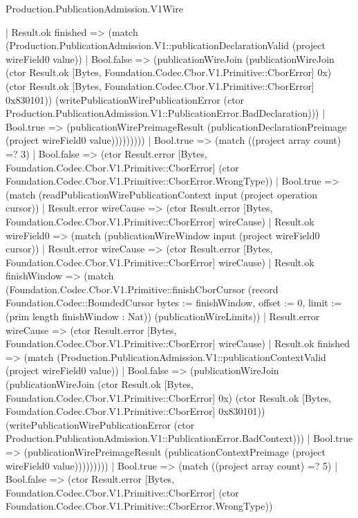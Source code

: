 \begin{lexlean}{Production.PublicationAdmission.V1Wire}
\begin{semanticmodule}
{                            | Result.ok finished => (match (Production.PublicationAdmission.V1::publicationDeclarationValid (project wireField0 value))
                              | Bool.false => (publicationWireJoin (publicationWireJoin (ctor Result.ok [Bytes, Foundation.Codec.Cbor.V1.Primitive::CborError] 0x) (ctor Result.ok [Bytes, Foundation.Codec.Cbor.V1.Primitive::CborError] 0x830101)) (writePublicationWirePublicationError (ctor Production.PublicationAdmission.V1::PublicationError.BadDeclaration)))
                              | Bool.true => (publicationWirePreimageResult (publicationDeclarationPreimage (project wireField0 value)))))))))
                  | Bool.true => (match ((project array count) =? 3)
                    | Bool.false => (ctor Result.error [Bytes, Foundation.Codec.Cbor.V1.Primitive::CborError] (ctor Foundation.Codec.Cbor.V1.Primitive::CborError.WrongType))
                    | Bool.true => (match (readPublicationWirePublicationContext input (project operation cursor))
                      | Result.error wireCause => (ctor Result.error [Bytes, Foundation.Codec.Cbor.V1.Primitive::CborError] wireCause)
                      | Result.ok wireField0 => (match (publicationWireWindow input (project wireField0 cursor))
                        | Result.error wireCause => (ctor Result.error [Bytes, Foundation.Codec.Cbor.V1.Primitive::CborError] wireCause)
                        | Result.ok finishWindow => (match (Foundation.Codec.Cbor.V1.Primitive::finishCborCursor (record Foundation.Codec::BoundedCursor {bytes := finishWindow, offset := 0, limit := (prim length finishWindow : Nat)}) (publicationWireLimits))
                          | Result.error wireCause => (ctor Result.error [Bytes, Foundation.Codec.Cbor.V1.Primitive::CborError] wireCause)
                          | Result.ok finished => (match (Production.PublicationAdmission.V1::publicationContextValid (project wireField0 value))
                            | Bool.false => (publicationWireJoin (publicationWireJoin (ctor Result.ok [Bytes, Foundation.Codec.Cbor.V1.Primitive::CborError] 0x) (ctor Result.ok [Bytes, Foundation.Codec.Cbor.V1.Primitive::CborError] 0x830101)) (writePublicationWirePublicationError (ctor Production.PublicationAdmission.V1::PublicationError.BadContext)))
                            | Bool.true => (publicationWirePreimageResult (publicationContextPreimage (project wireField0 value)))))))))
                | Bool.true => (match ((project array count) =? 5)
                  | Bool.false => (ctor Result.error [Bytes, Foundation.Codec.Cbor.V1.Primitive::CborError] (ctor Foundation.Codec.Cbor.V1.Primitive::CborError.WrongType))
}
\end{semanticmodule}
\end{lexlean}
